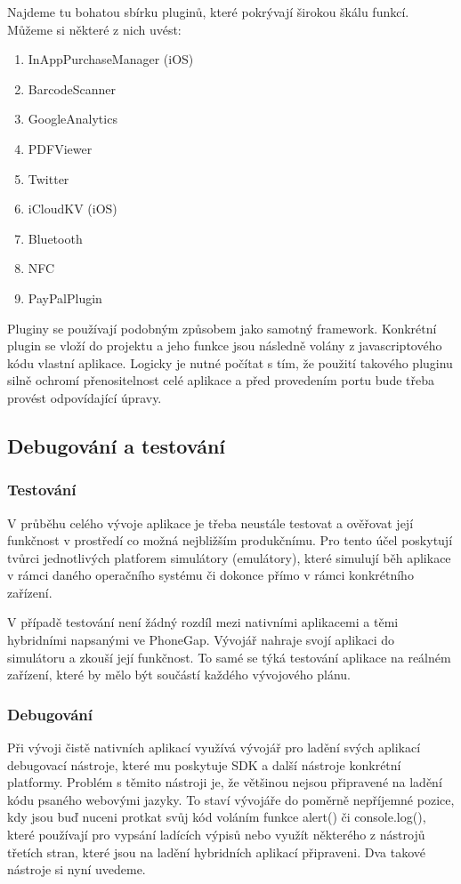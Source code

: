 Najdeme tu bohatou sbírku pluginů, které pokrývají širokou škálu funkcí. Můžeme si některé z nich uvést:

\begin{enumerate}
	\item InAppPurchaseManager (iOS)
	\item BarcodeScanner
	\item GoogleAnalytics
	\item PDFViewer
	\item Twitter
	\item iCloudKV (iOS)
	\item Bluetooth
	\item NFC
	\item PayPalPlugin
\end{enumerate}

Pluginy se používají podobným způsobem jako samotný framework. Konkrétní plugin se vloží do projektu a jeho funkce jsou následně volány z javascriptového kódu vlastní aplikace. Logicky je nutné počítat s tím, že použití takového pluginu silně ochromí přenositelnost celé aplikace a před provedením portu bude třeba provést odpovídající úpravy.

\subsection{Debugování a testování} \label{Sec:DebugaTest}
\subsubsection{Testování}
V průběhu celého vývoje aplikace je třeba neustále testovat a ověřovat její funkčnost v prostředí co možná nejbližším produkčnímu. Pro tento účel poskytují tvůrci jednotlivých platforem simulátory (emulátory), které simulují běh aplikace v rámci daného operačního systému či dokonce přímo v rámci konkrétního zařízení.

V případě testování není žádný rozdíl mezi nativními aplikacemi a těmi hybridními napsanými ve PhoneGap. Vývojář nahraje svojí aplikaci do simulátoru a zkouší její funkčnost. To samé se týká testování aplikace na reálném zařízení, které by mělo být součástí každého vývojového plánu.

\subsubsection{Debugování}
Při vývoji čistě nativních aplikací využívá vývojář pro ladění svých aplikací debugovací nástroje, které mu poskytuje SDK a další nástroje konkrétní platformy. Problém s těmito nástroji je, že většinou nejsou připravené na ladění kódu psaného webovými jazyky. To staví vývojáře do poměrně nepříjemné pozice, kdy jsou buď nuceni protkat svůj kód voláním funkce alert() či console.log(), které používají pro vypsání ladících výpisů nebo využít některého z nástrojů třetích stran, které jsou na ladění hybridních aplikací připraveni. Dva takové nástroje si nyní uvedeme.

